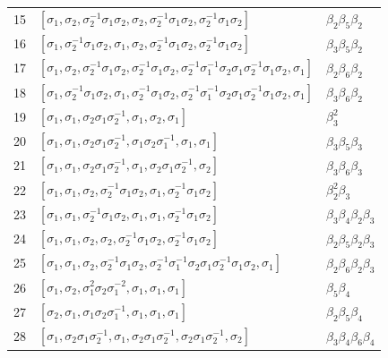 \documentclass[12pt,a4paper]{article}
\numberwithin{equation}{section}
\numberwithin{table}{section}
\begin{document}
\begin{table}[H]
\begin{tabular}{lll}
15&$[\sigma_1,\sigma_2,\sigma_2^{-1}\sigma_1\sigma_2,\sigma_2,\sigma_2^{-1}\sigma_1\sigma_2,
\sigma_2^{-1}\sigma_1\sigma_2]$&$\beta_2\beta_5\beta_2$\\
16&$[\sigma_1,\sigma_2^{-1}\sigma_1\sigma_2,\sigma_1,\sigma_2,\sigma_2^{-1}\sigma_1\sigma_2,
\sigma_2^{-1}\sigma_1\sigma_2]$&$\beta_3\beta_5\beta_2$\\
17&$[\sigma_1,\sigma_2,\sigma_2^{-1}\sigma_1\sigma_2,\sigma_2^{-1}\sigma_1\sigma_2,
\sigma_2^{-1}\sigma_1^{-1}\sigma_2\sigma_1\sigma_2^{-1}\sigma_1\sigma_2,\sigma_1]$&$\beta_2\beta_6\beta_2$\\
18&$[\sigma_1,\sigma_2^{-1}\sigma_1\sigma_2,\sigma_1,\sigma_2^{-1}\sigma_1\sigma_2,
\sigma_2^{-1}\sigma_1^{-1}\sigma_2\sigma_1\sigma_2^{-1}\sigma_1\sigma_2,\sigma_1]$&$\beta_3\beta_6\beta_2$\\
19&$[\sigma_1,\sigma_1,\sigma_2\sigma_1\sigma_2^{-1},\sigma_1,\sigma_2,\sigma_1]$&$\beta_3^{2}$\\
20&$[\sigma_1,\sigma_1,\sigma_2\sigma_1\sigma_2^{-1},\sigma_1\sigma_2\sigma_1^{-1},\sigma_1,\sigma_1]$&$\beta_3\beta_5\beta_3$\\
\noalign{\smallskip}\hline\noalign{\smallskip}
21&$[\sigma_1,\sigma_1,\sigma_2\sigma_1\sigma_2^{-1},\sigma_1,\sigma_2\sigma_1\sigma_2^{-1},\sigma_2]$&$\beta_3\beta_6\beta_3$\\
22&$[\sigma_1,\sigma_1,\sigma_2,\sigma_2^{-1}\sigma_1\sigma_2,\sigma_1,\sigma_2^{-1}\sigma_1\sigma_2]$&$\beta_2^{2}\beta_3$\\
23&$[\sigma_1,\sigma_1,\sigma_2^{-1}\sigma_1\sigma_2,\sigma_1,\sigma_1,
\sigma_2^{-1}\sigma_1\sigma_2]$&$\beta_3\beta_4\beta_2\beta_3$\\
24&$[\sigma_1,\sigma_1,\sigma_2,\sigma_2,
\sigma_2^{-1}\sigma_1\sigma_2,\sigma_2^{-1}\sigma_1\sigma_2]$&$\beta_2\beta_5\beta_2\beta_3$\\
25&$[\sigma_1,\sigma_1,\sigma_2,\sigma_2^{-1}\sigma_1\sigma_2,
\sigma_2^{-1}\sigma_1^{-1}\sigma_2\sigma_1\sigma_2^{-1}\sigma_1\sigma_2,\sigma_1]$&$\beta_2\beta_6\beta_2\beta_3$\\
26&$[\sigma_1,\sigma_2,\sigma_1^{2}\sigma_2\sigma_1^{-2},\sigma_1,\sigma_1,\sigma_1]$&$\beta_5\beta_4$\\
27&$[\sigma_2,\sigma_1,\sigma_1\sigma_2\sigma_1^{-1},\sigma_1,\sigma_1,\sigma_1]$&$\beta_2\beta_5\beta_4$\\
28&$[\sigma_1,\sigma_2\sigma_1\sigma_2^{-1},\sigma_1,\sigma_2\sigma_1\sigma_2^{-1},\sigma_2\sigma_1\sigma_2^{-1},
\sigma_2]$&$\beta_3\beta_4\beta_6\beta_4$\\

\end{tabular}
\end{table}
\end{document}
